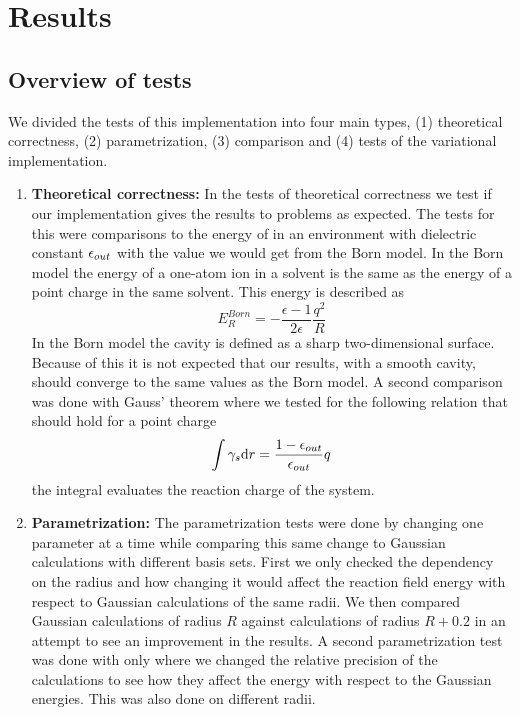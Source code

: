 \documentclass[../master_thesis.tex]{subfiles}
\begin{document}
\chapter{Results}\label{chap:Results}
\section{Overview of tests}
We divided the tests of this implementation into four main types, (1) theoretical
correctness, (2) parametrization, (3) comparison and (4) tests of the variational implementation.
\begin{enumerate}

\item \textbf{Theoretical correctness:}
In the tests of theoretical correctness we test if our implementation gives the
results to problems as expected. The tests for this were comparisons to
the energy of   in an environment with dielectric constant $\epsilon_{out}$
with the value we would get from the Born model. In the Born model the energy of a  %
one-atom ion in a solvent is the same as the energy of a point charge in the same solvent.
This energy is described as \cite{Tomasi:1994wt}
\begin{equation}\label{eq:bornenergy}
  E_{R}^{Born} =-\frac{\epsilon-1}{2 \epsilon} \frac{q^{2}}{R}
\end{equation}
In the Born model the cavity is defined as a sharp two-dimensional surface. Because of this
it is not expected that our results, with a smooth cavity, should converge to the same values as
the Born model.
A second comparison was done with Gauss' theorem\cite{Sorland} where we tested for the
following relation that should hold for a point charge
\begin{equation}\label{eq:Reactioncharge}
  \int \gamma_s \text{d}r= \frac{1 - \epsilon_{out} }{\epsilon_{out}} q
\end{equation}
the integral evaluates the reaction charge of the system.

\item \textbf{Parametrization:} The parametrization tests were done by changing one parameter at a time while
comparing this same change to Gaussian calculations with different basis sets.
First we only checked the dependency on the radius and how changing it would
affect the reaction field energy with respect to Gaussian calculations of the same
radii. We then compared Gaussian calculations of radius $R$ against \mrchem
calculations of radius $R+0.2$ in an attempt to see an improvement in the
results.
A second parametrization test was done with only 
where we changed the relative precision of the \mrchem calculations to see how
they affect the energy with respect to the Gaussian energies. This was also done
on different radii.


\end{enumerate}
\end{document}
